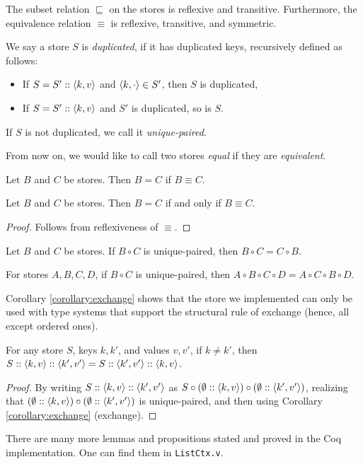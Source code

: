 \begin{lemma}
The subset relation $\sqsubseteq$ on the stores is reflexive and transitive. Furthermore, the equivalence relation $\equiv$ is reflexive, transitive, and symmetric.
\end{lemma}

\begin{definition}
We say a store $S$ is \textit{duplicated}, if it has duplicated keys, recursively defined as follows:
\begin{itemize}
    \item If $S = S' :: \langle k, v \rangle$ and $\left\langle k, \cdot \right\rangle \in S'$, then $S$ is duplicated,
    \item If $S = S' :: \langle k, v \rangle$ and $S'$ is duplicated, so is $S$.
\end{itemize}
If $S$ is not duplicated, we call it \textit{unique-paired}.
\end{definition}

From now on, we would like to call two stores \textit{equal} if they are \textit{equivalent}.

\begin{axiom}[Extensionality]
\label{axiom:extentionality}
Let $B$ and $C$ be stores. Then $B = C$ if $B \equiv C$.
\end{axiom}

\begin{corollary}
Let $B$ and $C$ be stores. Then $B = C$ if and only if $B \equiv C$.
\end{corollary}
\begin{proof}
Follows from reflexiveness of $\equiv$.
\end{proof}

\begin{theorem}[Commute]
\label{theorem:commute}
Let $B$ and $C$ be stores. If $B \circ C$ is unique-paired, then $B \circ C = C \circ B$.
\end{theorem}

\begin{corollary}[Exchange]
\label{corollary:exchange}
For stores $A, B, C, D$, if $B \circ C$ is unique-paired, then $A \circ B \circ C \circ D = A \circ C \circ B \circ D$.
\end{corollary}

Corollary \ref{corollary:exchange} shows that the store we implemented can only be used with type systems that support the structural rule of exchange (hence, all except ordered ones).

\begin{lemma}
\label{lemma:append_commut}
For any store $S$, keys $k, k'$, and values $v, v'$, if $k \not= k'$, then $S :: \left\langle k, v \right\rangle :: \left\langle k', v' \right\rangle = S :: \left\langle k', v' \right\rangle :: \left\langle k, v \right\rangle$.
\end{lemma}
\begin{proof}
By writing $S :: \left\langle k, v \right\rangle :: \left\langle k', v' \right\rangle$ as $S \circ (\emptyset :: \left\langle k, v \right\rangle) \circ (\emptyset :: \left\langle k', v' \right\rangle)$, realizing that $(\emptyset :: \left\langle k, v \right\rangle) \circ (\emptyset :: \left\langle k', v' \right\rangle)$ is unique-paired, and then using Corollary \ref{corollary:exchange} (exchange).
\end{proof}

There are many more lemmas and propositions stated and proved in the Coq implementation. One can find them in \texttt{ListCtx.v}.